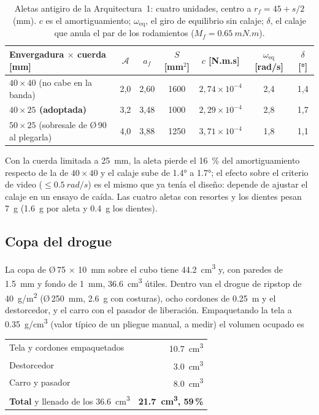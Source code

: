 \begin{table}[H]
\centering\small
\caption{Aletas antigiro de la Arquitectura~1: cuatro unidades, centro a $r_f=45+s/2$ (mm).
$c$ es el amortiguamiento; $\omega_\text{eq}$, el giro de equilibrio sin calaje; $\delta$, el
calaje que anula el par de los rodamientos ($M_f=\SI{0.65}{mN.m}$).}\label{tab:arq-aletas}
\begin{tabular}{@{}lcccccc@{}}
\toprule
\textbf{Envergadura $\times$ cuerda} [mm] & $\mathcal A$ & $a_f$ & $S$ [mm$^2$] & $c$ [N.m.s] & $\omega_\text{eq}$ [rad/s] & $\delta$ [\si{\degree}]\\\midrule
$40\times40$ (no cabe en la banda)  & 2,0 & 2,60 & 1600 & $2{,}74\times10^{-4}$ & 2,4 & 1,4\\
\textbf{$40\times25$ (adoptada)}    & 3,2 & 3,48 & 1000 & $2{,}29\times10^{-4}$ & 2,8 & 1,7\\
$50\times25$ (sobresale de Ø\,90 al plegarla) & 4,0 & 3,88 & 1250 & $3{,}71\times10^{-4}$ & 1,8 & 1,1\\
\bottomrule
\end{tabular}
\end{table}

Con la cuerda limitada a \SI{25}{mm}, la aleta pierde el \SI{16}{\percent} del amortiguamiento
respecto de la de $40\times40$ y el calaje sube de \ang{1.4} a \ang{1.7}; el efecto sobre el
criterio de video ($\le\SI{0.5}{rad/s}$) es el mismo que ya tenía el diseño: depende de ajustar el calaje
en un ensayo de caída. Las cuatro aletas con resortes y los dientes pesan \SI{7}{g}
(\SI{1.6}{g} por aleta y \SI{0.4}{g} los dientes).

\subsection{Copa del drogue}
La copa de Ø\,75 $\times$ \SI{10}{mm} sobre el cubo tiene \SI{44.2}{cm^3} y, con paredes de \SI{1.5}{mm} y
fondo de \SI{1}{mm}, \SI{36.6}{cm^3} útiles. Dentro van el drogue de ripstop de \SI{40}{g/m^2}
(Ø\,\SI{250}{mm}, \SI{2.6}{g} con costuras), ocho cordones de \SI{0.25}{m} y el destorcedor, y el carro con el
pasador de liberación. Empaquetando la tela a \SI{0.35}{g/cm^3} (valor típico de un pliegue
manual, a medir) el volumen ocupado es

\begin{center}
\begin{tabular}{@{}lr@{}}
\toprule
Tela y cordones empaquetados & \SI{10.7}{cm^3}\\
Destorcedor & \SI{3.0}{cm^3}\\
Carro y pasador & \SI{8.0}{cm^3}\\\midrule
\textbf{Total} y llenado de los \SI{36.6}{cm^3} & \textbf{\SI{21.7}{cm^3}, 59\,\%}\\
\bottomrule
\end{tabular}
\end{center}

